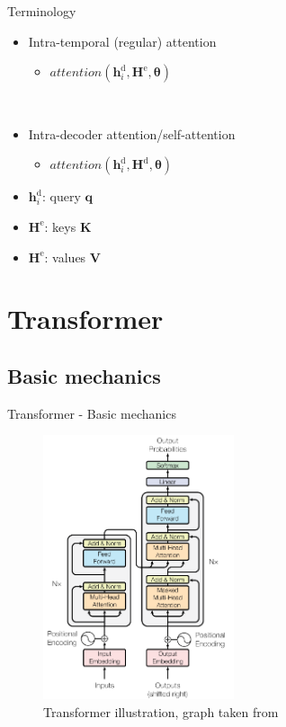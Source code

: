 \documentclass{beamer}
\begin{document}
\begin{frame}{Terminology}
\begin{itemize}
\item Intra-temporal (regular) attention
\begin{itemize}
	\item $attention(\mathbf{h}^{\text{d}}_i, \mathbf{H}^{\text{e}}, \mathbf{\theta})$
\end{itemize}
\ \\
\item Intra-decoder attention/self-attention
\begin{itemize}
	\item $attention(\mathbf{h}^{\text{d}}_i, \mathbf{H}^{\text{d}}, \mathbf{\theta})$
\end{itemize}
\end{itemize}

\begin{itemize}
	\item $\mathbf{h}^{\text{d}}_i$: query $\mathbf{q}$
	\item $\mathbf{H}^{\text{e}}$: keys $\mathbf{K}$
	\item $\mathbf{H}^{\text{e}}$: values $\mathbf{V}$
\end{itemize}
\end{frame}

\section{Transformer}

\subsection{Basic mechanics}
\begin{frame}{Transformer - Basic mechanics}
	\begin{figure}[t]
		\includegraphics[width=0.5\textwidth]{figures/vaswani-trans-clean.png}
		\caption{Transformer illustration, graph taken from \cite{vaswani_attention_2017}}
	\end{figure}
\end{frame}
\end{document}
